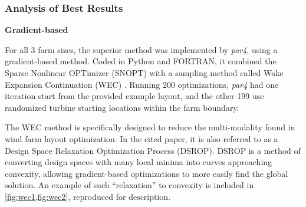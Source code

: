 
\subsubsection{Analysis of Best Results}

	\vspace{3mm}
	\noindent\textbf{Gradient-based}\newline

	For all 3 farm sizes, the superior method was implemented by \textit{par4}, using a gradient-based method.
	Coded in Python and FORTRAN, it combined the Sparse Nonlinear OPTimizer (SNOPT) \cite{SNOPT} with a sampling method called Wake Expansion Continuation (WEC) \cite{Thomas2018}.
	Running 200 optimizations, \textit{par4} had one iteration start from the provided example layout, and the other 199 use randomized turbine starting locations within the farm boundary.

	The WEC method is specifically designed to reduce the multi-modality found in wind farm layout optimization.
	In the cited paper\cite{Thomas2018}, it is also referred to as a Design Space Relaxation Optimization Process (DSROP).
	DSROP is a method of converting design spaces with many local minima into curves approaching convexity, allowing gradient-based optimizations to more easily find the global solution.
	An example of such ``relaxation'' to convexity is included in \cref{fig:wec1,fig:wec2}, reproduced for description.

